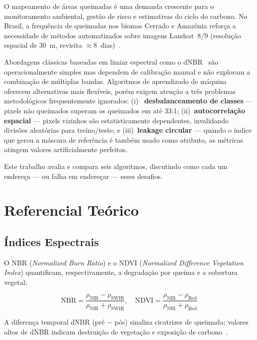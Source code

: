 \documentclass[conference]{IEEEtran}
\begin{document}
O mapeamento de áreas queimadas é uma demanda crescente para o
monitoramento ambiental, gestão de risco e estimativas do ciclo do
carbono. No Brasil, a frequência de queimadas nos biomas Cerrado e
Amazônia reforça a necessidade de métodos automatizados sobre imagens
Landsat~8/9 (resolução espacial de 30~m, revisita $\approx$8~dias)~\cite{b1}.

Abordagens clássicas baseadas em limiar espectral como o dNBR~\cite{b2}
são operacionalmente simples mas dependem de calibração manual e não
exploram a combinação de múltiplas bandas. Algoritmos de aprendizado de
máquina oferecem alternativas mais flexíveis, porém exigem atenção a
três problemas metodológicos frequentemente ignorados: (i)~\textbf{
desbalanceamento de classes} — pixels não queimados superam os queimados
em até 33:1; (ii)~\textbf{autocorrelação espacial} — pixels vizinhos
são estatisticamente dependentes, invalidando divisões aleatórias para
treino/teste; e (iii)~\textbf{leakage circular} — quando o índice que
gerou a máscara de referência é também usado como atributo, as métricas
atingem valores artificialmente perfeitos.

Este trabalho avalia e compara seis algoritmos, discutindo como cada
um endereça — ou falha em endereçar — esses desafios.

\section{Referencial Teórico}

\subsection{Índices Espectrais}

O NBR (\textit{Normalized Burn Ratio}) e o NDVI (\textit{Normalized
Difference Vegetation Index}) quantificam, respectivamente, a degradação
por queima e a cobertura vegetal:

\begin{equation}
  \mathrm{NBR} = \frac{\rho_\text{NIR}-\rho_\text{SWIR}}
                      {\rho_\text{NIR}+\rho_\text{SWIR}}, \quad
  \mathrm{NDVI} = \frac{\rho_\text{NIR}-\rho_\text{Red}}
                       {\rho_\text{NIR}+\rho_\text{Red}}
  \label{eq:indices}
\end{equation}

A diferença temporal dNBR (pré $-$ pós) sinaliza cicatrizes de queimada;
valores altos de dNBR indicam destruição de vegetação e exposição de
carbono~\cite{b2}.
\end{document}
